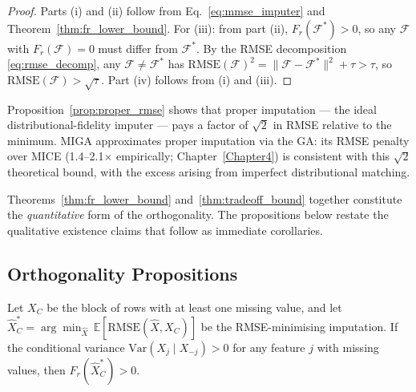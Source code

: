 \begin{proof}
Parts (i) and (ii) follow from Eq.~\eqref{eq:mmse_imputer} and Theorem~\ref{thm:fr_lower_bound}. For (iii): from part (ii), $F_r(\mathcal{F}^*) > 0$, so any $\mathcal{F}$ with $F_r(\mathcal{F}) = 0$ must differ from $\mathcal{F}^*$. By the RMSE decomposition \eqref{eq:rmse_decomp}, any $\mathcal{F} \neq \mathcal{F}^*$ has $\mathrm{RMSE}(\mathcal{F})^2 = \|\mathcal{F} - \mathcal{F}^*\|^2 + \tau > \tau$, so $\mathrm{RMSE}(\mathcal{F}) > \sqrt{\tau}$. Part (iv) follows from (i) and (iii). \end{proof}

\begin{remark}
Proposition~\ref{prop:proper_rmse} shows that proper imputation --- the ideal distributional-fidelity imputer --- pays a factor of $\sqrt{2}$ in RMSE relative to the minimum. MIGA approximates proper imputation via the GA: its RMSE penalty over MICE (1.4--2.1$\times$ empirically; Chapter~\ref{Chapter4}) is consistent with this $\sqrt{2}$ theoretical bound, with the excess arising from imperfect distributional matching.
\end{remark}

Theorems~\ref{thm:fr_lower_bound} and~\ref{thm:tradeoff_bound} together constitute the \emph{quantitative} form of the orthogonality. The propositions below restate the qualitative existence claims that follow as immediate corollaries.

\subsection{Orthogonality Propositions}
\label{sec:orthogonality_props}

\begin{proposition}
\label{prop:rmse_implies_fr}
Let $X_C$ be the block of rows with at least one missing value, and let
$\hat{X}_C^{*} = \arg\min_{\hat{X}}\,\mathbb{E}[\mathrm{RMSE}(\hat{X}, X_C)]$
be the RMSE-minimising imputation.
If the conditional variance $\mathrm{Var}(X_j \mid X_{-j}) > 0$ for any feature $j$ with missing values, then $F_r(\hat{X}_C^{*}) > 0$.
\end{proposition}

